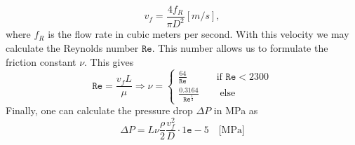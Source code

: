 \documentclass{article}
\begin{document}
\begin{equation}
v_{f} = \frac{4f_R}{\pi D^2} [m/s], 
\end{equation}
where $f_R$ is the flow rate in cubic meters per second. With this velocity we may calculate the Reynolds number $\mathtt{Re}$. This number allows us to formulate the friction constant $\nu$. This gives 
\begin{equation}
\mathtt{Re} = \frac{v_fL}{\mu} \Rightarrow \nu = \begin{cases} \frac{64}{\mathtt{Re}} &\quad \text{if } \mathtt{Re} <2300\\
\frac{0.3164}{\mathtt{Re}^{\frac{1}{4}}}&\quad  \text{ else}
\end{cases} 
\end{equation}
Finally, one can calculate the pressure drop $\Delta P$ in MPa as
\begin{equation}
\Delta P = L\nu \frac{\rho}{2}\frac{v_f^2}{D}\cdot 1\mathtt{e}-5 \quad\text{[MPa]}
\end{equation}
\end{document}
